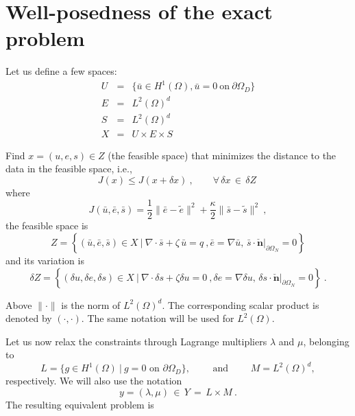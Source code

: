 \documentclass{article}
\begin{document}
\section{Well-posedness of the exact problem}

Let us define a few spaces:
\begin{eqnarray} 
U&=&\{\bar{u}\in H^1(\Omega), \bar{u}=0~\mbox{on}~\partial \Omega_D \}\\
E&=&L^2(\Omega)^d \\
S&=&L^2(\Omega)^d \\
X&=&U\times E \times S 
\end{eqnarray}

\bigskip

 Find $x=\left ( u,e,s\right )\in Z$ (the feasible space) that minimizes the distance to the data in the feasible space, i.e.,
\begin{equation}
J(x) \leq J(x+\delta x)~,\qquad \forall \,\delta x\,\in\,\delta Z~
\end{equation}
where 
\begin{equation}
J(\bar{u},\bar{e},\bar{s})=\frac12 \|\bar{e}-\tilde{e}\|^2 + \frac{\kappa}{2} \|\bar{s}-\tilde{s}\|^2~,
\end{equation}
the feasible space is
\begin{equation}
Z=\left \{ (\bar{u},\bar{e},\bar{s})\in X~|~\nabla \cdot \bar{s} + \zeta \,\bar{u} = q~, \bar{e}=\nabla \bar{u},\,\left. \bar{s}\cdot\mathbf{\check{n}}\right |_{\partial \Omega_N}=0 \right \}
\end{equation}
and its variation is
\begin{equation}
\delta Z=\left \{ (\delta{u},\delta{e},\delta{s})\in X~|~\nabla \cdot \delta{s} + \zeta \delta{u} = 0~, \delta{e}=\nabla \delta{u} ,\,\left. \delta{s}\cdot\mathbf{\check{n}}\right |_{\partial \Omega_N}=0\right \}~.
\end{equation}

\bigskip

Above $\|\cdot\|$ is the norm of $L^2(\Omega)^d$. The corresponding scalar product is denoted by $\left ( \cdot , \cdot \right )$. The same notation will be used for $L^2(\Omega)$.

Let us now relax the constraints through Lagrange multipliers $\lambda$ and $\mu$, belonging to 
$$
L=\{g\in H^1(\Omega)~|~g=0 \mbox{ on } \partial \Omega_D\},\qquad
\mbox{ and }\qquad M=L^2(\Omega)^d,  
$$
respectively. We will also use the notation
$$
y=\left (\lambda,\mu\right )\,\in \,Y\,=\,L\times M~.
$$
The resulting equivalent problem is
\end{document}
